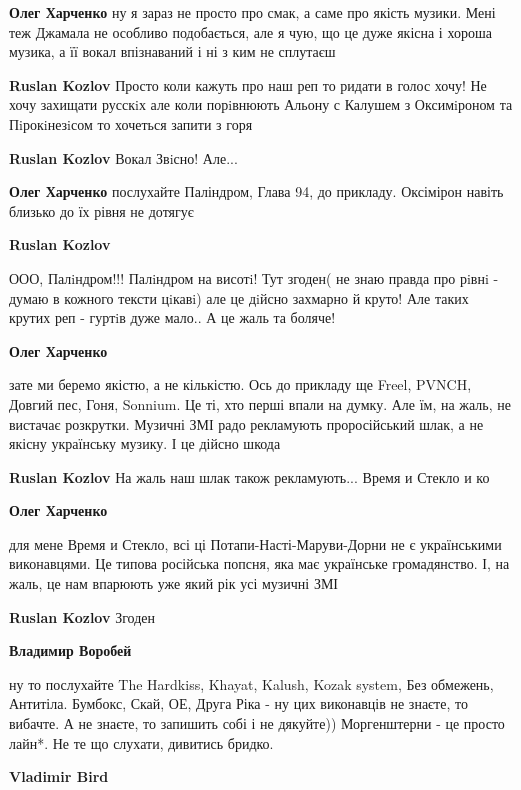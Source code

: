 \begin{itemize}
\begin{itemize}
\textbf{Олег Харченко} ну я зараз не просто про смак, а саме про якість музики. Мені теж Джамала не особливо подобається, але я чую, що це дуже якісна і хороша музика, а її вокал впізнаваний і ні з ким не сплутаєш

\textbf{Ruslan Kozlov} Просто коли кажуть про наш реп то ридати в голос хочу! Не хочу захищати русскiх але коли порiвнюють Альону с Калушем з Оксимiроном та Пiрокiнезiсом то хочеться запити з горя

\textbf{Ruslan Kozlov} Вокал Звiсно! Але...

\textbf{Олег Харченко} послухайте Паліндром, Глава 94, до прикладу. Оксімірон навіть близько до їх рівня не дотягує

\textbf{Ruslan Kozlov} 

ООО, Палiндром!!! Палiндром на висотi! Тут згоден( не знаю правда про рiвнi -
думаю в кожного тексти цiкавi) але це дiйсно захмарно й круто! Але таких крутих
реп - гуртiв дуже мало.. А це жаль та боляче!

\textbf{Олег Харченко} 

зате ми беремо якістю, а не кількістю. Ось до прикладу ще Freel, PVNCH, Довгий
пес, Гоня, Sonnium. Це ті, хто перші впали на думку. Але їм, на жаль, не
вистачає розкрутки. Музичні ЗМІ радо рекламують проросійський шлак, а не якісну
українську музику. І це дійсно шкода

\textbf{Ruslan Kozlov} На жаль наш шлак також рекламують... Время и Стекло и ко

\textbf{Олег Харченко} 

для мене Время и Стекло, всі ці Потапи-Насті-Маруви-Дорни не є українськими
виконавцями. Це типова російська попсня, яка має українське громадянство. І, на
жаль, це нам впарюють уже який рік усі музичні ЗМІ

\textbf{Ruslan Kozlov} Згоден

\textbf{Владимир Воробей} 

ну то послухайте The Hardkiss, Khayat, Kalush, Kozak system, Без
обмежень, Антитіла. Бумбокс, Скай, ОЕ, Друга Ріка - ну цих виконавців не знаєте, то
вибачте. А не знаєте, то запишить собі і не дякуйте)) Моргенштерни - це просто
лайн*. Не те що слухати, дивитись бридко.

\textbf{Vladimir Bird} 


\end{itemize}
\end{itemize}
